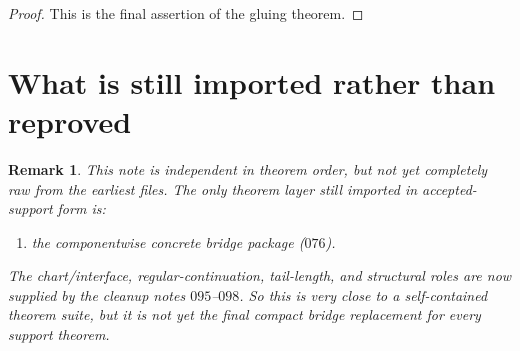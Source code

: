 \documentclass[11pt]{article}
\newtheorem{remark}[theorem]{Remark}
\begin{document}
\begin{proof}
This is the final assertion of the gluing theorem.
\end{proof}

\section{What is still imported rather than reproved}

\begin{remark}
This note is independent in theorem order, but not yet completely raw from the
earliest files. The only theorem layer still imported in accepted-support form
is:
\begin{enumerate}[label=\textup{(\arabic*)},leftmargin=2.5em]
\item the componentwise concrete bridge package ($076$).
\end{enumerate}
The chart/interface, regular-continuation, tail-length, and structural roles
are now supplied by the cleanup notes $095$--$098$. So this is very close to a
self-contained theorem suite, but it is not yet the final compact bridge
replacement for every support theorem.
\end{remark}
\end{document}
